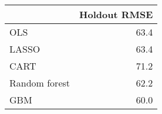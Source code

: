 
\begin{tabular}{lr}
\toprule
  & Holdout RMSE\\
\midrule
OLS & 63.4\\
LASSO & 63.4\\
CART & 71.2\\
Random forest & 62.2\\
GBM & 60.0\\
\bottomrule
\end{tabular}
